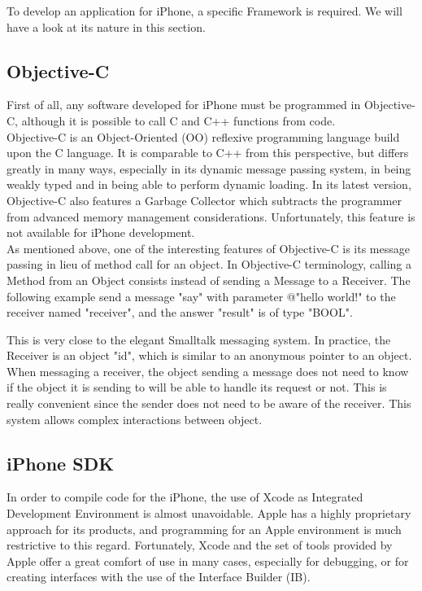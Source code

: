 To develop an application for iPhone, a specific Framework is required. We will have a look at its nature in this section.

\subsection{Objective-C}

First of all, any software developed for iPhone must be programmed in Objective-C, although it is possible to call C and C++ functions from code.\\

Objective-C is an Object-Oriented (OO) reflexive programming language build upon the C language. It is comparable to C++ from this perspective, but differs greatly in many ways, especially in its dynamic message passing system, in being weakly typed and in being able to perform dynamic loading. In its latest version, Objective-C also features a Garbage Collector which subtracts the programmer from advanced memory management considerations. Unfortunately, this feature is not available for iPhone development.\\

As mentioned above, one of the interesting features of Objective-C is its message passing in lieu of method call for an object. In Objective-C terminology, calling a Method from an Object consists instead of sending a Message to a Receiver. The following example send a message "say" with parameter @"hello world!"  to the receiver named "receiver", and the answer "result" is of type "BOOL".

\parbox{15cm}{

}

This is very close to the elegant Smalltalk messaging system. In practice, the Receiver is an object "id", which is similar to an anonymous pointer to an object. When messaging a receiver, the object sending a message does not need to know if the object it is sending to will be able to handle its request or not. This is really convenient since the sender does not need to be aware of the receiver. This system allows complex interactions between object.

\subsection{iPhone SDK}

In order to compile code for the iPhone, the use of Xcode as Integrated Development Environment is almost unavoidable. Apple has a highly proprietary approach for its products, and programming for an Apple environment is much restrictive to this regard. Fortunately, Xcode and the set of tools provided by Apple offer a great comfort of use in many cases, especially for debugging, or for creating interfaces with the use of the Interface Builder (IB).\\

